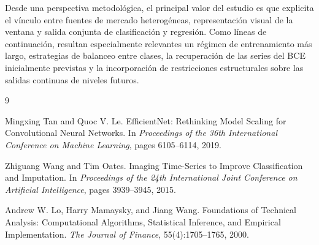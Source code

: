 \documentclass[11pt,a4paper]{article}
\begin{document}
Desde una perspectiva metodológica, el principal valor del estudio es que explicita el vínculo entre fuentes de mercado heterogéneas, representación visual de la ventana y salida conjunta de clasificación y regresión. Como líneas de continuación, resultan especialmente relevantes un régimen de entrenamiento más largo, estrategias de balanceo entre clases, la recuperación de las series del BCE inicialmente previstas y la incorporación de restricciones estructurales sobre las salidas continuas de niveles futuros.

\begin{thebibliography}{9}

Mingxing Tan and Quoc V. Le.
\newblock EfficientNet: Rethinking Model Scaling for Convolutional Neural Networks.
\newblock In \emph{Proceedings of the 36th International Conference on Machine Learning}, pages 6105--6114, 2019.

Zhiguang Wang and Tim Oates.
\newblock Imaging Time-Series to Improve Classification and Imputation.
\newblock In \emph{Proceedings of the 24th International Joint Conference on Artificial Intelligence}, pages 3939--3945, 2015.

Andrew W. Lo, Harry Mamaysky, and Jiang Wang.
\newblock Foundations of Technical Analysis: Computational Algorithms, Statistical Inference, and Empirical Implementation.
\newblock \emph{The Journal of Finance}, 55(4):1705--1765, 2000.

\end{thebibliography}
\end{document}
